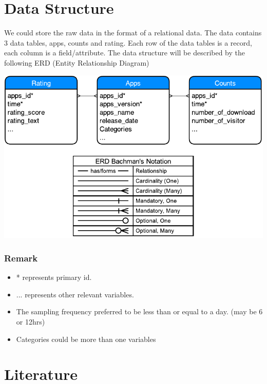 \documentclass[11pt,twoside]{article}
\begin{document}
\section{Data Structure}
We could store the raw data in the format of a relational data. The data contains 3 data tables, apps, counts and rating. Each row of the data tables is a record, each column is a field/attribute. The data structure will be described by the following ERD (Entity Relationship Diagram) 

\begin{center}
\includegraphics{erd1.pdf}
\end{center}

\subsubsection*{Remark}
\begin{itemize}
	\item * represents primary id. 
	\item ... represents other relevant variables.
	\item The sampling frequency preferred to be less than or equal to a day. (may be 6 or 12hrs)
	\item Categories could be more than one variables
\end{itemize}


\section{Literature}
\newpage




\newpage

\appendix
\renewcommand{\thesection}{Appendix \Roman{section}}
\renewcommand{\thesubsection}{Appendix \Roman{section}(\roman{subsection})}
\end{document}
